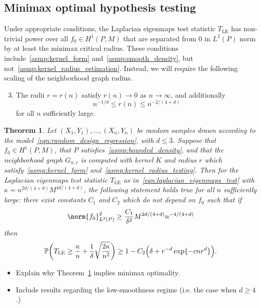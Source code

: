 \documentclass{article}
\newcommand{\1}{\mathbf{1}}
\newcommand{\Leb}{L}
\newcommand{\Pbb}{\mathbb{P}}
\newcommand{\LE}{\mathrm{LE}}
\theoremstyle{alden}
\theoremstyle{aldenthm}
\newtheorem{theorem}{Theorem}
\theoremstyle{definition}
\theoremstyle{remark}
\begin{document}
\subsection{Minimax optimal hypothesis testing}

Under appropriate conditions, the Laplacian eigenmaps test statistic $T_{\LE}$ has non-trivial power over all $f_0 \in H^1(P,M)$ that are separated from $0$ in $\Leb^2(P)$ norm by at least the minimax critical radius. These conditions include~\ref{asmp:kernel_form} and~\ref{asmp:smooth_density}, but not~\ref{asmp:kernel_radius_estimation}. Instead, we will require the following scaling of the neighborhood graph radius.
\begin{enumerate}[label=(K\arabic*)]
	\setcounter{enumi}{2}
	\item 
	\label{asmp:kernel_radius_testing}
	The radii $r = r(n)$ satisfy $r(n) \to 0$ as $n \to \infty$, and additionally
	\begin{equation*}
	n^{-1/d} \leq r(n) \leq n^{-2/(4 + d)}
	\end{equation*}
	for all $n$ sufficiently large.
\end{enumerate}

\begin{theorem}
	\label{thm:laplacian_eigenmaps_testing1}
	Let $(X_1,Y_1),\ldots,(X_n,Y_n)$ be random samples drawn according to the model~\eqref{eqn:random_design_regression}, with $d \leq 3$. Suppose that $f_0 \in H^1(P,M)$, that
	$P$ satisfies~\ref{asmp:bounded_density}, and that the neighborhood graph $G_{n,r}$ is computed with kernel $K$ and radius $r$ which satisfy~\ref{asmp:kernel_form} and~\ref{asmp:kernel_radius_testing}.
	Then for the Laplacian eigenmaps test statistic $T_{\LE}$ as in~\eqref{eqn:laplacian_eigenmaps_test} with $\kappa = n^{2d/(4 + d)} M^{4d/(4 + d)}$, the following statement holds true for all $n$ sufficiently large: there exist constants $C_1$ and $C_2$ which do not depend on $f_0$ such that if
	\begin{equation}
	\label{eqn:laplacian_eigenmaps_testing}
	\norm{f_0}_{\Leb^2(P)}^2 \geq \frac{C_1}{\delta^2} M^{2d/(4 + d)} n^{-4/(4 + d)}
	\end{equation}
	then
	\begin{equation*}
	\Pbb \biggl(T_{\LE} \geq \frac{\kappa}{n} + \frac{1}{\delta}\sqrt{\frac{2\kappa}{n^2}}\biggr) \geq 1 - C_2\Bigl(\delta + r^{-d} \exp\{- c n r^d\}\Bigr).
	\end{equation*}
\end{theorem}
\begin{itemize}
	\item Explain why Theorem~\ref{thm:laplacian_eigenmaps_testing1} implies minimax optimality.
	\item Include results regarding the low-smoothness regime (i.e. the case when $d \geq 4$.)
\end{itemize}
\end{document}

